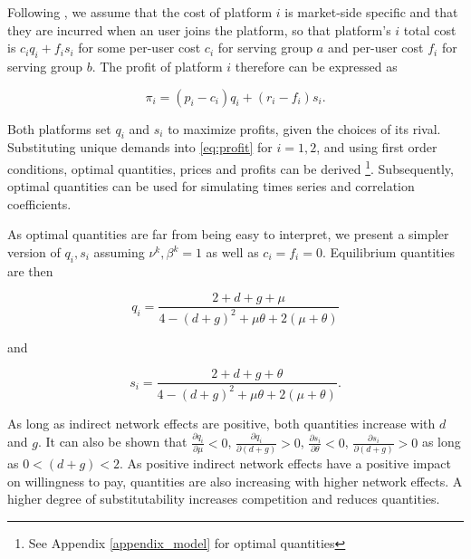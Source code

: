 \documentclass[12pt,a4paper,notitlepage]{article}
\begin{document}
Following \cite{armstrong_competition_2006}, we assume that the cost of platform $i$ is market-side specific and that they are incurred when an user joins the platform, so that platform's $i$ total cost is $c_i q_i+f_i s_i$ for some per-user cost $c_i$ for serving group $a$ and per-user cost $f_i$ for serving group $b$. The profit of platform $i$ therefore can be expressed as 

\begin{equation}\label{eq:profit}
\pi_i=(p_i-c_i)q_i+(r_i-f_i)s_i.
\end{equation}

Both platforms set $q_i$ and $s_i$ to maximize profits, given the choices of its rival. Substituting unique demands into \ref{eq:profit} for $i=1,2$, and using first order conditions, optimal quantities, prices and profits can be derived \footnote{See Appendix \ref{appendix_model} for optimal quantities}. Subsequently, optimal quantities can be used for simulating times series and correlation coefficients. 


 As optimal quantities are far from being easy to interpret, we present a simpler version of $q_i, s_i$ assuming $\nu^k, \beta^k=1$  as well as $c_i=f_i=0$. Equilibrium quantities are then

\begin{equation}\label{eq_quantities1}
	q_i=\frac{2+d+g+\mu}{4-(d+g)^2+\mu\theta+2(\mu+\theta)}
\end{equation}

and

\begin{equation}\label{eq_quantities2}
	s_i=\frac{2+d+g+\theta}{4-(d+g)^2+\mu\theta+2(\mu+\theta)}.
\end{equation}

As long as indirect network effects are positive, both quantities increase with $d$ and $g$. It can also be shown that $\frac{\partial q_i}{\partial \mu}<0$, $\frac{\partial q_i}{\partial (d+g)}>0$, $\frac{\partial s_i}{\partial \theta}<0$, $\frac{\partial s_i}{\partial (d+g)}>0$ as long as $0<(d+g)<2$. As positive indirect network effects have a positive impact on willingness to pay, quantities are also increasing with higher network effects. A higher degree of substitutability increases competition and reduces quantities.  






\end{document}
